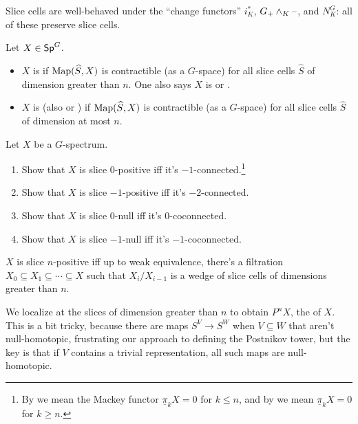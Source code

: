 Slice cells are well-behaved under the ``change functors'' $i_K^*$, $G_+\wedge_K\text{--}$, and $N_K^G$: all of these
preserve slice cells.
\begin{defn}
Let $X\in\mathsf{Sp}^G$.
\begin{itemize}
	\item $X$ is  if $\operatorname{Map}(\widehat S, X)$ is contractible (as a $G$-space) for all slice
	cells $\widehat S$ of dimension greater than $n$. One also says $X$ is  or
	.
	\item $X$ is  (also  or ) if $\operatorname{Map}(\widehat S,
	X)$ is contractible (as a $G$-space) for all slice cells $\widehat S$ of dimension at most $n$.
\end{itemize}
\end{defn}
\begin{ex}
Let $X$ be a $G$-spectrum.
\label{slicerecognition}
\begin{enumerate}
	\item Show that $X$ is slice $0$-positive iff it's $-1$-connected.\footnote{By  we mean
	the Mackey functor $\underline\pi_kX = 0$ for $k\le n$, and by  we mean
	$\underline\pi_kX = 0$ for $k\ge n$.}
	\item Show that $X$ is slice $-1$-positive iff it's $-2$-connected.
	\item Show that $X$ is slice $0$-null iff it's $0$-coconnected.
	\item Show that $X$ is slice $-1$-null iff it's $-1$-coconnected.
\end{enumerate}
\end{ex}
\begin{prop}
$X$ is slice $n$-positive iff up to weak equivalence, there's a filtration $X_0\subseteq
X_1\subseteq\dotsb\subseteq X$ such that $X_i/X_{i-1}$ is a wedge of slice cells of dimensions greater than $n$.
\end{prop}

We localize at the slices of dimension greater than $n$ to obtain $P^nX$, the
 of $X$. This is a bit tricky, because there are maps
$S^V\to S^W$ when $V\subseteq W$ that aren't null-homotopic, frustrating our approach to defining the Postnikov
tower, but the key is that if $V$ contains a trivial representation, all such maps are
null-homotopic.


